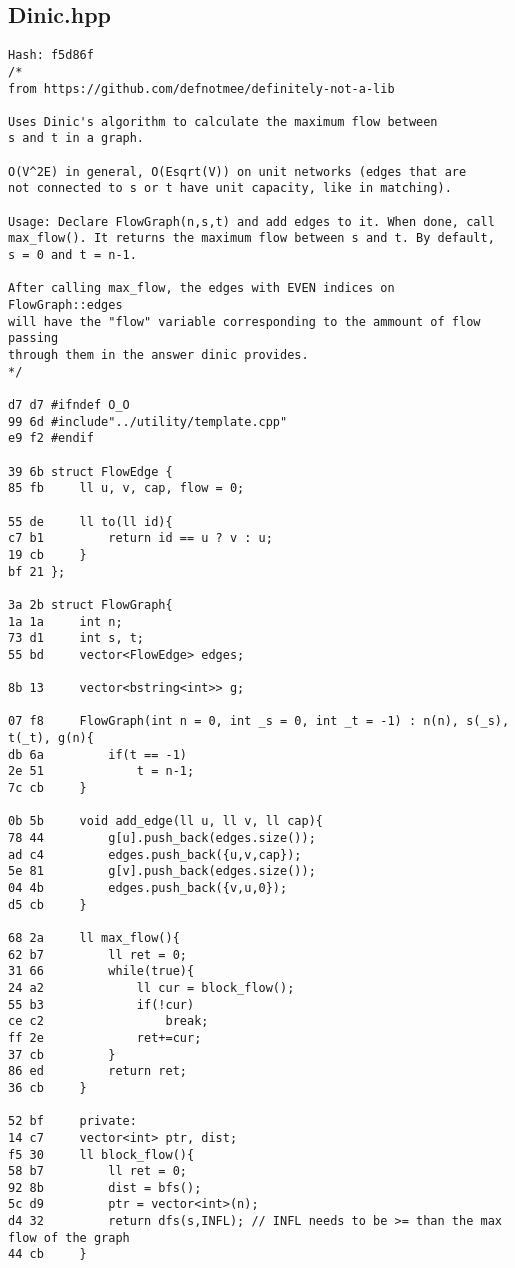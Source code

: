 \documentclass[11pt, a4paper, twoside]{article}
\begin{document}
\subsection{Dinic.hpp}
\begin{lstlisting}
Hash: f5d86f
/*
from https://github.com/defnotmee/definitely-not-a-lib

Uses Dinic's algorithm to calculate the maximum flow between
s and t in a graph.

O(V^2E) in general, O(Esqrt(V)) on unit networks (edges that are
not connected to s or t have unit capacity, like in matching).

Usage: Declare FlowGraph(n,s,t) and add edges to it. When done, call
max_flow(). It returns the maximum flow between s and t. By default,
s = 0 and t = n-1.

After calling max_flow, the edges with EVEN indices on FlowGraph::edges
will have the "flow" variable corresponding to the ammount of flow passing
through them in the answer dinic provides.
*/

d7 d7 #ifndef O_O
99 6d #include"../utility/template.cpp"
e9 f2 #endif

39 6b struct FlowEdge {
85 fb     ll u, v, cap, flow = 0;
      
55 de     ll to(ll id){
c7 b1         return id == u ? v : u;
19 cb     }
bf 21 };

3a 2b struct FlowGraph{
1a 1a     int n;
73 d1     int s, t;
55 bd     vector<FlowEdge> edges;
      
8b 13     vector<bstring<int>> g;
      
07 f8     FlowGraph(int n = 0, int _s = 0, int _t = -1) : n(n), s(_s), t(_t), g(n){
db 6a         if(t == -1)
2e 51             t = n-1;
7c cb     }
      
0b 5b     void add_edge(ll u, ll v, ll cap){
78 44         g[u].push_back(edges.size());
ad c4         edges.push_back({u,v,cap});
5e 81         g[v].push_back(edges.size());
04 4b         edges.push_back({v,u,0});
d5 cb     }
      
68 2a     ll max_flow(){
62 b7         ll ret = 0;
31 66         while(true){
24 a2             ll cur = block_flow();
55 b3             if(!cur)
ce c2                 break;
ff 2e             ret+=cur;
37 cb         }
86 ed         return ret;
36 cb     }
      
52 bf     private:
14 c7     vector<int> ptr, dist;
f5 30     ll block_flow(){
58 b7         ll ret = 0;
92 8b         dist = bfs();
5c d9         ptr = vector<int>(n);
d4 32         return dfs(s,INFL); // INFL needs to be >= than the max flow of the graph
44 cb     }
      

\end{lstlisting}
\end{document}
